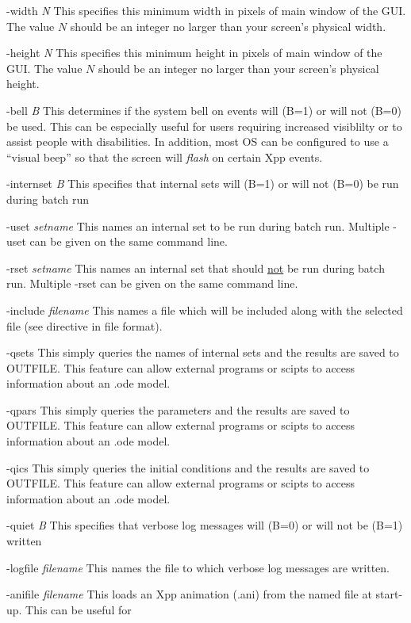 \begin{description}
\item{-width  \emph{N}} This specifies this minimum width in pixels of main window of the GUI. The value $N$ should be an integer no larger than your screen's physical width.
\item{-height \emph{N}} This specifies this minimum height in pixels of main window of the GUI. The value $N$ should be an integer no larger than your screen's physical height.              
\item{-bell \emph{B}} This determines if the system bell on events will (B=1) or will not (B=0) be used.  This can be especially useful
for users requiring increased visiblilty or to assist people with disabilities.  In addition, most OS can be configured to use a ``visual beep''
so that the screen will \emph{flash} on certain Xpp events. 
\item{-internset \emph{B}} This specifies that internal sets will (B=1) or will not (B=0) be run during batch run
\item{-uset \emph{setname}}  This names an internal set to be run during batch run.  Multiple -uset can be given on the same command line.
\item{-rset \emph{setname}} This names an internal set that should \underline{not} be run during batch run. Multiple -rset can be given on the same command line.
\item{-include \emph{filename}} This names a file which will be included along with the selected {} file (see {} directive in {} file format).
\item{-qsets} This simply queries the names of internal sets and the results are saved to OUTFILE.  This feature can allow 
external programs or scipts to access information about an .ode model. 
\item{-qpars} This simply queries the  parameters and the results are saved to OUTFILE.  This feature can allow 
external programs or scipts to access information about an .ode model.
\item{-qics} This simply queries the initial conditions and the results are saved to OUTFILE.  This feature can allow 
external programs or scipts to access information about an .ode model.          
 \item{-quiet \emph{B}}  This specifies that verbose log messages will (B=0) or will not be (B=1) written
\item{-logfile \emph{filename}} This names the file to which verbose log messages are written. 
\item{-anifile \emph{filename}} This loads an Xpp animation (.ani) from the named file at start-up.  This can be useful for

\end{description}
